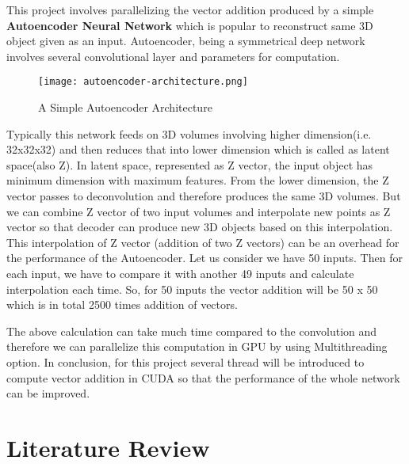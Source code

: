 \documentclass[11pt]{article}       %
\begin{document}
This project involves parallelizing the vector addition produced by a simple \textbf{Autoencoder Neural Network}  which is popular to reconstruct same 3D object given as an input. Autoencoder, being a symmetrical deep network involves several convolutional layer and parameters for computation.
\begin{figure}[h]
\begin{center}
\texttt{[image: autoencoder-architecture.png]}
\caption{A Simple Autoencoder Architecture}
\end{center}
\end{figure}
Typically this network feeds on 3D volumes involving higher dimension(i.e. 32x32x32) and then reduces that into lower dimension \cite{dr8} which is called as latent space(also Z). In latent space, represented as Z vector, the input object has minimum dimension with maximum features. From the lower dimension, the Z vector passes to deconvolution and therefore produces the same 3D volumes. But we can combine Z vector of two input volumes and interpolate new points as Z vector so that decoder can produce new 3D objects based on this interpolation. This interpolation of Z vector (addition of two Z vectors) can be an overhead for the performance of the Autoencoder. Let us consider we have 50 inputs. Then for each input, we have to compare it with another 49 inputs and calculate interpolation each time. So, for 50 inputs the vector addition will be 50 x 50 which is in total 2500 times addition of vectors.

The above calculation can take much time compared to the convolution and therefore we can parallelize this computation in GPU by using Multithreading option. In conclusion, for this project several thread will be introduced to compute vector addition in CUDA so that the performance of the whole network can be improved.    
 

\section{Literature Review} \label{litrev}
\end{document}

